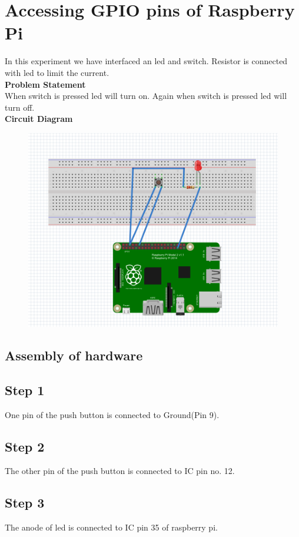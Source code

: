 \documentclass[a4paper,12pt,oneside]{book}
\begin{document}
\section{Accessing GPIO pins of Raspberry Pi}
\flushleft
In this experiment we have interfaced an led and switch. Resistor is connected with led to limit the current. \\
\textbf{Problem Statement} \\
When switch is pressed led will turn on. Again when switch is pressed led will turn off.\\
\textbf{Circuit Diagram}\\
\begin{figure}[H]
    \centering
    \includegraphics[scale=0.6]{GPIO}
    \caption{}
\end{figure}
\subsection*{Assembly of hardware}
\subsection*{Step 1}
One pin of the push button is connected to Ground(Pin 9).
\subsection*{Step 2}
The other pin of the push button is connected to IC pin no. 12.
\subsection*{Step 3}
The anode of led is connected to IC pin 35 of raspberry pi.
\end{document}
